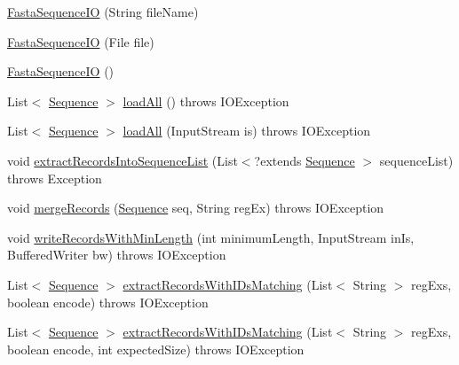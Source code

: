 \begin{DoxyCompactItemize}
\item 
\hyperlink{classbroad_1_1core_1_1sequence_1_1_fasta_sequence_i_o_a07d0added6b1ecfe9d0cfa10d182b949}{Fasta\+Sequence\+I\+O} (String file\+Name)
\item 
\hyperlink{classbroad_1_1core_1_1sequence_1_1_fasta_sequence_i_o_a0bd9835f2db17b755ccb9ead8e49c981}{Fasta\+Sequence\+I\+O} (File file)
\item 
\hyperlink{classbroad_1_1core_1_1sequence_1_1_fasta_sequence_i_o_a63879fc2ecf70ce75440e723c1e4e370}{Fasta\+Sequence\+I\+O} ()
\item 
List$<$ \hyperlink{classbroad_1_1core_1_1sequence_1_1_sequence}{Sequence} $>$ \hyperlink{classbroad_1_1core_1_1sequence_1_1_fasta_sequence_i_o_aef2c94f97fc18b53b799cc878bbf5323}{load\+All} ()  throws I\+O\+Exception 
\item 
List$<$ \hyperlink{classbroad_1_1core_1_1sequence_1_1_sequence}{Sequence} $>$ \hyperlink{classbroad_1_1core_1_1sequence_1_1_fasta_sequence_i_o_a92863f4a02b932682c5c8d8bc4b9fa78}{load\+All} (Input\+Stream is)  throws I\+O\+Exception 
\item 
void \hyperlink{classbroad_1_1core_1_1sequence_1_1_fasta_sequence_i_o_a94c1360dfeb1f00535073c168c94dd35}{extract\+Records\+Into\+Sequence\+List} (List$<$?extends \hyperlink{classbroad_1_1core_1_1sequence_1_1_sequence}{Sequence} $>$ sequence\+List)  throws Exception 
\item 
void \hyperlink{classbroad_1_1core_1_1sequence_1_1_fasta_sequence_i_o_af154ff4095e0c7d558b4259bf3752b45}{merge\+Records} (\hyperlink{classbroad_1_1core_1_1sequence_1_1_sequence}{Sequence} seq, String reg\+Ex)  throws I\+O\+Exception 
\item 
void \hyperlink{classbroad_1_1core_1_1sequence_1_1_fasta_sequence_i_o_a0c295bd33475eac47a3d7f8e95c55ab6}{write\+Records\+With\+Min\+Length} (int minimum\+Length, Input\+Stream in\+Is, Buffered\+Writer bw)  throws I\+O\+Exception 
\item 
List$<$ \hyperlink{classbroad_1_1core_1_1sequence_1_1_sequence}{Sequence} $>$ \hyperlink{classbroad_1_1core_1_1sequence_1_1_fasta_sequence_i_o_ab8bbce97f9449f0f65584dba5dfda6a2}{extract\+Records\+With\+I\+Ds\+Matching} (List$<$ String $>$ reg\+Exs, boolean encode)  throws I\+O\+Exception 
\item 
List$<$ \hyperlink{classbroad_1_1core_1_1sequence_1_1_sequence}{Sequence} $>$ \hyperlink{classbroad_1_1core_1_1sequence_1_1_fasta_sequence_i_o_a038f09d76755f5e834da504a138bb958}{extract\+Records\+With\+I\+Ds\+Matching} (List$<$ String $>$ reg\+Exs, boolean encode, int expected\+Size)  throws I\+O\+Exception 

\end{DoxyCompactItemize}

